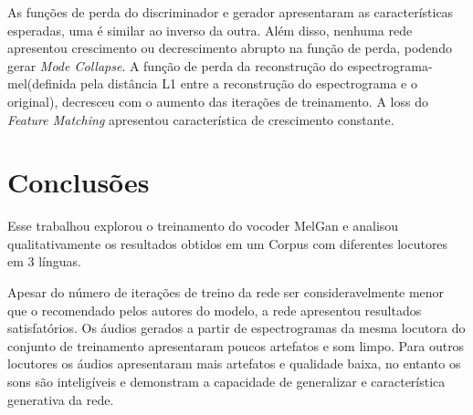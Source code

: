 \documentclass{article}
\begin{document}
As funções de perda do discriminador e gerador apresentaram as características esperadas, uma é similar ao inverso da outra. Além disso, nenhuma rede apresentou crescimento ou decrescimento abrupto na função de perda, podendo gerar \textit{Mode Collapse}. A função de perda da reconstrução do espectrograma-mel(definida pela distância L1 entre a reconstrução do espectrograma e o original), decresceu com o aumento das iterações de treinamento. A loss do \textit{Feature Matching} apresentou característica de crescimento constante.

\section{Conclusões}
\label{sec:typestyle}

Esse trabalhou explorou o treinamento do vocoder MelGan e analisou qualitativamente os resultados obtidos em um Corpus com diferentes locutores em 3 línguas. 

Apesar do número de iterações de treino da rede ser consideravelmente menor que o recomendado pelos autores do modelo\cite{melgan}, a rede apresentou resultados satisfatórios. Os áudios gerados a partir de espectrogramas da mesma locutora do conjunto de treinamento apresentaram poucos artefatos e som limpo. Para outros locutores os áudios apresentaram mais artefatos e qualidade baixa, no entanto os sons são inteligíveis e demonstram a capacidade de generalizar e característica generativa da rede. 








\end{document}
